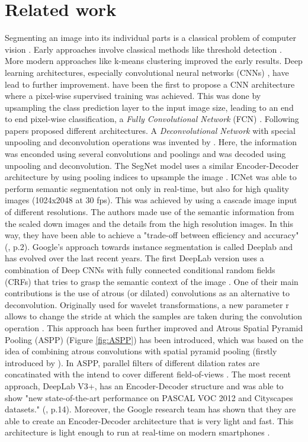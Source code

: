 \documentclass[11pt,
  paper=a4, 
  bibliography=totocnumbered,
	captions=tableheading,
	BCOR=10mm
]{scrreprt}
\theoremstyle{definition}
\newcommand{\figref}[1]{(Figure \ref{#1})}
\begin{document}
\section{Related work}
\label{sec:related_work}

Segmenting an image into its individual parts is a classical problem of computer vision \cite{Szeliski2011}. 
Early approaches involve classical methods like threshold detection \cite{Smith1979}.
More modern approaches like k-means clustering \cite{Dhanachandra2015} improved the early results.
Deep learning architectures, especially convolutional neural networks (CNNs) \cite{Fukushima1980}, have lead to further improvement.
\textcite{Shelhamer2017} have been the first to propose a CNN architecture where a pixel-wise supervised training was achieved. 
This was done by upsampling the class prediction layer to the input image size, leading to an end to end pixel-wise classification, a \textit{Fully Convolutional Network} (FCN) \cite{Shelhamer2017}.
Following papers proposed different architectures.
A \textit{Deconvolutional Network} with special unpooling and deconvolution operations was invented by \textcite{Noh2015}. 
Here, the information was enconded using several convolutions and poolings and was decoded using unpooling and deconvolution.
The SegNet model uses a similar Encoder-Decoder architecture by using pooling indices to upsample the image \cite{Badrinarayanan2017}.
ICNet \cite{Zhao2017} was able to perform semantic segmentation not only in real-time, but also for high quality images (1024x2048 at 30 fps). 
This was achieved by using a cascade image input of different resolutions. 
The authors made use of the semantic information from the scaled down images and the details from the high resolution images.
In this way, they have been able to achieve a "trade-off between efficiency and accuracy" (\cite{Zhao2017}, p.2).
Google's approach towards instance segmentation is called Deeplab and has evolved over the last recent years.
The first DeepLab version uses a combination of Deep CNNs with fully connected conditional random fields (CRFs) that tries to grasp the semantic context of the image \cite{Chen2018}. 
One of their main contributions is the use of atrous (or dilated) convolutions as an alternative to deconvolution. 
Originally used for wavelet transformations, a new parameter r allows to change the stride at which the samples are taken during the convolution operation \cite{Chen2018}.
This approach has been further improved and Atrous Spatial Pyramid Pooling (ASPP) \figref{fig:ASPP} has been introduced, which was based on the idea of combining atrous convolutions with spatial pyramid pooling \cite{Chen2018a} (firstly introduced by \textcite{He2014}).
In ASPP, parallel filters of different dilation rates are concatinated with the intend to cover different field-of-views \cite{Chen2018a}.
The most recent approach, DeepLab V3+, has an Encoder-Decoder structure and was able to show "new state-of-the-art performance on PASCAL VOC 2012 and Cityscapes datasets." (\cite{Chen2018b}, p.14).
Moreover, the Google research team has shown that they are able to create an Encoder-Decoder architecture that is very light and fast.
This architecture is light enough to run at real-time on modern smartphones \cite{Bazarevsky2018}.
\end{document}
